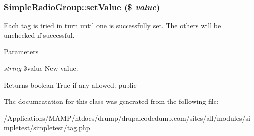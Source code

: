 \hypertarget{class_simple_radio_group_a013490f1ead7db2b42af159ac71a1272}{
\subsubsection[{setValue}]{\setlength{\rightskip}{0pt plus 5cm}SimpleRadioGroup::setValue (\$ {\em value})}}
\label{class_simple_radio_group_a013490f1ead7db2b42af159ac71a1272}
Each tag is tried in turn until one is successfully set. The others will be unchecked if successful. 
\begin{DoxyParams}{Parameters}
\item[{\em string}]\$value New value. \end{DoxyParams}
\begin{DoxyReturn}{Returns}
boolean True if any allowed.  public 
\end{DoxyReturn}


The documentation for this class was generated from the following file:\begin{DoxyCompactItemize}
\item 
/Applications/MAMP/htdocs/drump/drupalcodedump.com/sites/all/modules/simpletest/simpletest/tag.php\end{DoxyCompactItemize}
